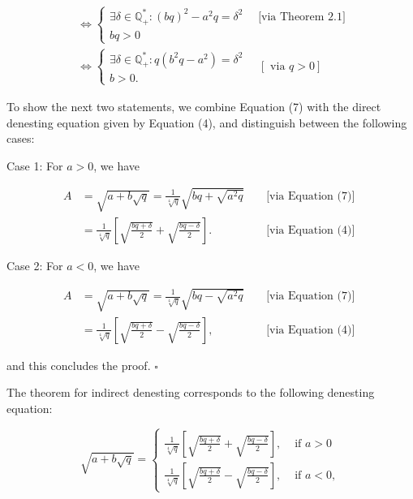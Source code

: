 \documentclass[11pt,letterpaper]{article}
\begin{document}
\[
\begin{aligned}
& \Longleftrightarrow\left\{\begin{array}{l}
\exists \delta \in \mathbb{Q}_{+}^{*}:(b q)^{2}-a^{2} q=\delta^{2} \quad \text { [via Theorem 2.1] } \\
b q>0
\end{array}\right. \\
& \Longleftrightarrow\left\{\begin{array}{l}
\exists \delta \in \mathbb{Q}_{+}^{*}: q\left(b^{2} q-a^{2}\right)=\delta^{2} \\
b>0 .
\end{array} \quad[\text { via } q>0]\right.
\end{aligned}
\]

To show the next two statements, we combine Equation (7) with the direct denesting equation given by Equation (4), and distinguish between the following cases:

Case 1: For $a>0$, we have

\[
\begin{aligned}
A & =\sqrt{a+b \sqrt{q}}=\frac{1}{\sqrt[4]{q}} \sqrt{b q+\sqrt{a^{2} q}} & & \text { [via Equation (7)] } \\
& =\frac{1}{\sqrt[4]{q}}\left[\sqrt{\frac{b q+\delta}{2}}+\sqrt{\frac{b q-\delta}{2}}\right] . & & \text { [via Equation (4)] }
\end{aligned}
\]

Case 2: For $a<0$, we have

\[
\begin{aligned}
A & =\sqrt{a+b \sqrt{q}}=\frac{1}{\sqrt[4]{q}} \sqrt{b q-\sqrt{a^{2} q}} & & \text { [via Equation (7)] } \\
& =\frac{1}{\sqrt[4]{q}}\left[\sqrt{\frac{b q+\delta}{2}}-\sqrt{\frac{b q-\delta}{2}}\right], & & \text { [via Equation (4)] }
\end{aligned}
\]

and this concludes the proof. \(\square\)

The theorem for indirect denesting corresponds to the following denesting equation:

\[
\sqrt{a+b \sqrt{q}}= \begin{cases}\frac{1}{\sqrt[4]{q}}\left[\sqrt{\frac{b q+\delta}{2}}+\sqrt{\frac{b q-\delta}{2}}\right], & \text { if } a>0 \\ \frac{1}{\sqrt[4]{q}}\left[\sqrt{\frac{b q+\delta}{2}}-\sqrt{\frac{b q-\delta}{2}}\right], & \text { if } a<0,\end{cases}
\]
\end{document}
